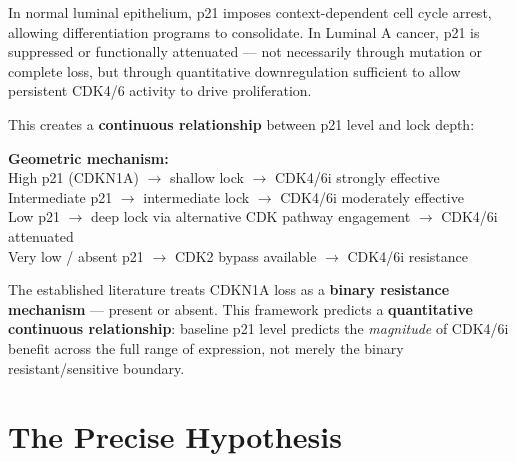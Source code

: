 \documentclass[12pt, a4paper]{article}
\begin{document}
In normal luminal epithelium, p21 imposes context-dependent
cell cycle arrest, allowing differentiation programs to
consolidate. In Luminal A cancer, p21 is suppressed or
functionally attenuated --- not necessarily through mutation
or complete loss, but through quantitative downregulation
sufficient to allow persistent CDK4/6 activity to drive
proliferation.

This creates a \textbf{continuous relationship} between
p21 level and lock depth:

\begin{center}
\colorbox{mechanismbox}{
\begin{minipage}{0.82\textwidth}
\vspace{0.5em}
\textbf{Geometric mechanism:}\\[0.4em]
High p21 (CDKN1A) $\rightarrow$ shallow lock $\rightarrow$
CDK4/6i strongly effective \\[0.3em]
Intermediate p21 $\rightarrow$ intermediate lock $\rightarrow$
CDK4/6i moderately effective \\[0.3em]
Low p21 $\rightarrow$ deep lock via alternative CDK pathway
engagement $\rightarrow$ CDK4/6i attenuated \\[0.3em]
Very low / absent p21 $\rightarrow$ CDK2 bypass available
$\rightarrow$ CDK4/6i resistance
\vspace{0.5em}
\end{minipage}}
\end{center}

\vspace{0.5em}

The established literature treats CDKN1A loss as a
\textbf{binary resistance mechanism} --- present or absent.
This framework predicts a \textbf{quantitative continuous
relationship}: baseline p21 level predicts the
\emph{magnitude} of CDK4/6i benefit across the full range
of expression, not merely the binary resistant/sensitive
boundary.

\section{The Precise Hypothesis}
\end{document}
